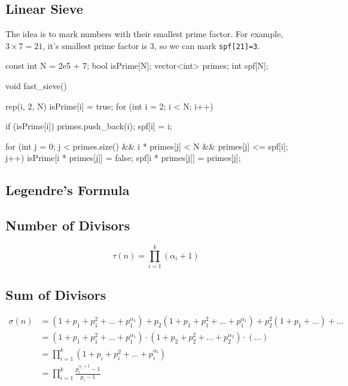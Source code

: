 \documentclass[12pt]{extarticle}
\begin{document}
\subsection*{Linear Sieve}
The idea is to mark numbers with their smallest prime factor. For example, $3\times 7=21$, it's smallest prime factor is 3, so we can mark \texttt{spf[21]=3}.
\begin{cpp}
const int N = 2e5 + 7;
bool isPrime[N];
vector<int> primes;
int spf[N];

void fast_sieve() {
	rep(i, 2, N) isPrime[i] = true;
	for (int i = 2; i < N; i++) {
		if (isPrime[i]) {
			primes.push_back(i);
			spf[i] = i;
		}
		
		for (int j = 0; j < primes.size() && i * primes[j] < N && primes[j] <= spf[i]; j++) {
			isPrime[i * primes[j]] = false;
			spf[i * primes[j]] = primes[j];
		}
	}
}
\end{cpp}
\subsection*{Legendre's Formula}
\subsection*{Number of Divisors}
$$\tau(n)=\prod_{i=1}^{k}(\alpha_{i}+1)$$
\subsection*{Sum of Divisors}
\begin{align*}
\sigma(n)&=(1+p_{1}+p_{1}^{2}+\dots+p_{1}^{\alpha_{1}})+p_{2}(1+p_{1}+p_{1}^{2}+\dots+p_{1}^{\alpha_{1}})+p_{2}^{2}(1+p_{1}+\dots)+\dots\\
&=(1+p_{1}+p_{1}^{2}+\dots+p_{1}^{\alpha_{1}})\cdot(1+p_{2}+p_{2}^{2}+\dots+p_{2}^{\alpha_{2}})\cdot(\dots)\\
&=\prod_{i=1}^{k}(1+p_{i}+p_{i}^{2}+\dots+p_{i}^{\alpha_{i}})\\
&=\prod_{i=1}^{k}\frac{p_{i}^{\alpha_{i}+1}-1}{p_{i}-1}
\end{align*}
\end{document}
